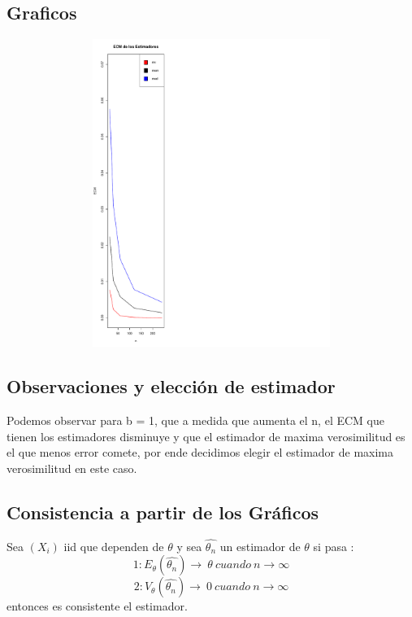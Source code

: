 \documentclass[a4paper]{article}
\begin{document}
\subsection{Graficos}
\begin{figure}[H]
	\centering
	\includegraphics[width=15cm, height=10cm]{Ejercicio-7-plot}
\end{figure}

\subsection{Observaciones y elección de estimador}
Podemos observar para b = 1, que a medida que aumenta el n, el ECM  que tienen los estimadores disminuye y que el estimador de maxima verosimilitud es el que menos error comete, por ende decidimos elegir el estimador de maxima verosimilitud en este caso.   

\subsection{Consistencia a partir de los Gráficos}
Sea  $(X_{i}) $ iid que dependen de $\theta$ y sea $\hat{\theta_{n}}$ un estimador de $\theta$ si pasa : \newline
\[1: E_{\theta}{(\hat{\theta_{n}})} \rightarrow \ \theta \ cuando \ n \rightarrow \infty \] \newline
\[2: V_{\theta}{(\hat{\theta_{n}})} \rightarrow \ 0 \ cuando \ n \rightarrow \infty \] \newline
entonces es consistente el estimador. \newline
  
\end{document}
